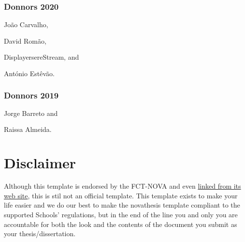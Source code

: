 \subsubsection*{Donnors 2020}
\label{ssub:donnors_2020}

\begin{inparaitem}[]
  \item João Carvalho, 
  \item David Romão, 
  \item DisplayersereStream, and
  \item António Estêvão.  
\end{inparaitem}

\subsubsection*{Donnors 2019}
\label{ssub:donnors_2019}

\begin{inparaitem}[]
  \item Jorge Barreto and
  \item Raissa Almeida.  
\end{inparaitem}



\section{Disclaimer}
\label{sec:disclaimer}

Although this template is endorsed by the FCT-NOVA and even \href{https://www.fct.unl.pt/estudante/informacao-academica}{linked from its web site}, this is stil not an official template.
%
This template exists to make your life easier and we do our best to make the \gls{novathesis} template compliant to the supported Schools' regulations, but in the end of the line you and only you are accountable for both the look and the contents of the document you submit as your thesis/dissertation.

